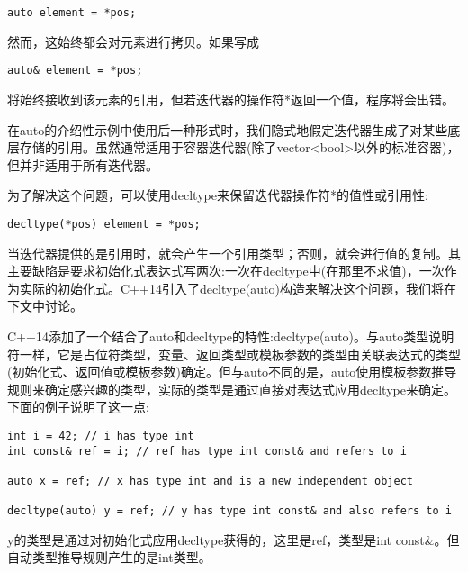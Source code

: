 \begin{lstlisting}[style=styleCXX]
auto element = *pos;
\end{lstlisting}

然而，这始终都会对元素进行拷贝。如果写成

\begin{lstlisting}[style=styleCXX]
auto& element = *pos;
\end{lstlisting}

将始终接收到该元素的引用，但若迭代器的操作符*返回一个值，程序将会出错。

\begin{tcolorbox}[colback=webgreen!5!white,colframe=webgreen!75!black]
\hspace*{0.75cm}在auto的介绍性示例中使用后一种形式时，我们隐式地假定迭代器生成了对某些底层存储的引用。虽然通常适用于容器迭代器(除了vector<bool>以外的标准容器)，但并非适用于所有迭代器。
\end{tcolorbox}

为了解决这个问题，可以使用decltype来保留迭代器操作符*的值性或引用性:

\begin{lstlisting}[style=styleCXX]
decltype(*pos) element = *pos;
\end{lstlisting}

当迭代器提供的是引用时，就会产生一个引用类型；否则，就会进行值的复制。其主要缺陷是要求初始化式表达式写两次:一次在decltype中(在那里不求值)，一次作为实际的初始化式。C++14引入了decltype(auto)构造来解决这个问题，我们将在下文中讨论。


C++14添加了一个结合了auto和decltype的特性:decltype(auto)。与auto类型说明符一样，它是占位符类型，变量、返回类型或模板参数的类型由关联表达式的类型(初始化式、返回值或模板参数)确定。但与auto不同的是，auto使用模板参数推导规则来确定感兴趣的类型，实际的类型是通过直接对表达式应用decltype来确定。下面的例子说明了这一点:

\begin{lstlisting}[style=styleCXX]
int i = 42; // i has type int
int const& ref = i; // ref has type int const& and refers to i

auto x = ref; // x has type int and is a new independent object

decltype(auto) y = ref; // y has type int const& and also refers to i
\end{lstlisting}

y的类型是通过对初始化式应用decltype获得的，这里是ref，类型是int const\&。但自动类型推导规则产生的是int类型。

